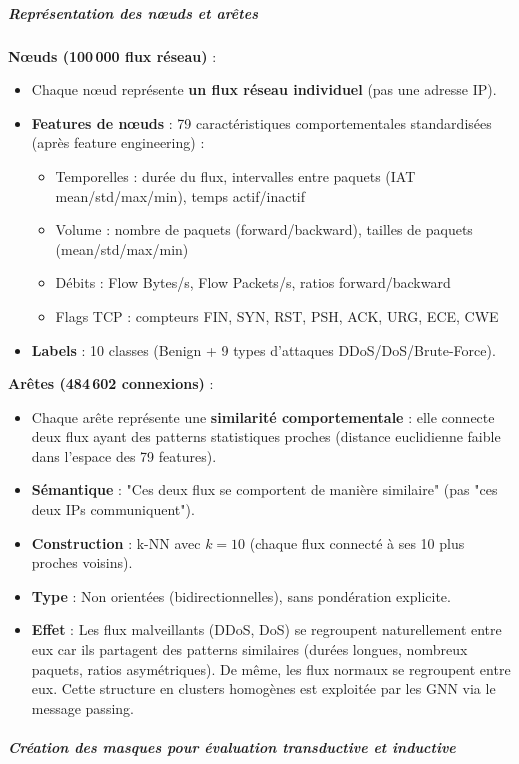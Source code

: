 ﻿\documentclass[11pt,a4paper]{article}
\begin{document}
\subparagraph{Représentation des nœuds et arêtes}

\textbf{Nœuds (100\,000 flux réseau)} :
\begin{itemize}
    \item Chaque nœud représente \textbf{un flux réseau individuel} (pas une adresse IP).
    \item \textbf{Features de nœuds} : 79 caractéristiques comportementales standardisées (après feature engineering) :
    \begin{itemize}
        \item Temporelles : durée du flux, intervalles entre paquets (IAT mean/std/max/min), temps actif/inactif
        \item Volume : nombre de paquets (forward/backward), tailles de paquets (mean/std/max/min)
        \item Débits : Flow Bytes/s, Flow Packets/s, ratios forward/backward
        \item Flags TCP : compteurs FIN, SYN, RST, PSH, ACK, URG, ECE, CWE
    \end{itemize}
    \item \textbf{Labels} : 10 classes (Benign + 9 types d'attaques DDoS/DoS/Brute-Force).
\end{itemize}

\textbf{Arêtes (484\,602 connexions)} :
\begin{itemize}
    \item Chaque arête représente une \textbf{similarité comportementale} : elle connecte deux flux ayant des patterns statistiques proches (distance euclidienne faible dans l'espace des 79 features).
    \item \textbf{Sémantique} : "Ces deux flux se comportent de manière similaire" (pas "ces deux IPs communiquent").
    \item \textbf{Construction} : k-NN avec $k = 10$ (chaque flux connecté à ses 10 plus proches voisins).
    \item \textbf{Type} : Non orientées (bidirectionnelles), sans pondération explicite.
    \item \textbf{Effet} : Les flux malveillants (DDoS, DoS) se regroupent naturellement entre eux car ils partagent des patterns similaires (durées longues, nombreux paquets, ratios asymétriques). De même, les flux normaux se regroupent entre eux. Cette structure en clusters homogènes est exploitée par les GNN via le message passing.
\end{itemize}

\subparagraph{Création des masques pour évaluation transductive et inductive}
\end{document}
